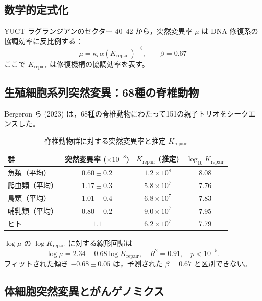 \documentclass[11pt,a4paper]{article}
\begin{document}
	\subsection{数学的定式化}
	
	YUCT ラグランジアンのセクター 40--42 から，突然変異率 \(\mu\) は DNA 修復系の協調効率に反比例する：
	\begin{equation}
		\mu = \kappa_c \alpha \left(K_{\text{repair}}\right)^{-\beta}, \qquad \beta = 0.67
		\label{eq:mutation-rate}
	\end{equation}
	ここで \(K_{\text{repair}}\) は修復機構の協調効率を表す。
	
	\subsection{生殖細胞系列突然変異：68種の脊椎動物}
	
	Bergeron ら (2023) は，68種の脊椎動物にわたって151の親子トリオをシークエンスした。
	
	\begin{table}[H]
		\centering
		\caption{脊椎動物群に対する突然変異率と推定 \(K_{\text{repair}}\)}
		\label{tab:vertebrate-mutations}
		\begin{tabular}{lccc}
			\toprule
			\textbf{群} & \textbf{突然変異率 (\(\times 10^{-8}\))} & \textbf{\(K_{\text{repair}}\) (推定)} & \(\log_{10} K_{\text{repair}}\) \\
			\midrule
			魚類（平均） & \(0.60 \pm 0.2\) & \(1.2 \times 10^8\) & 8.08 \\
			爬虫類（平均） & \(1.17 \pm 0.3\) & \(5.8 \times 10^7\) & 7.76 \\
			鳥類（平均） & \(1.01 \pm 0.4\) & \(6.8 \times 10^7\) & 7.83 \\
			哺乳類（平均） & \(0.80 \pm 0.2\) & \(9.0 \times 10^7\) & 7.95 \\
			ヒト & \(1.1\) & \(6.2 \times 10^7\) & 7.79 \\
			\bottomrule
		\end{tabular}
	\end{table}
	
	\(\log \mu\) の \(\log K_{\text{repair}}\) に対する線形回帰は
	\begin{equation}
		\log \mu = 2.34 - 0.68 \log K_{\text{repair}}, \quad R^2 = 0.91, \quad p < 10^{-5}.
		\label{eq:mutation-fit}
	\end{equation}
	フィットされた傾き \(-0.68 \pm 0.05\) は，予測された \(\beta = 0.67\) と区別できない。
	
	\subsection{体細胞突然変異とがんゲノミクス}
	
\end{document}
